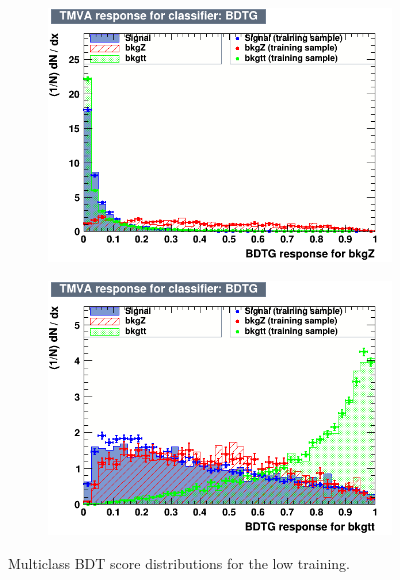 \begin{figure}[!htbp]
  \begin{subfigure}[b]{0.495\textwidth}
    \centering
    \includegraphics[width=\linewidth]{images/plots_overtrain_lt200/overtrain_bkgZ_BDTG.png}
    \label{fig:overtrain_bkgZ}
  \end{subfigure}%
  \hfill
  \begin{subfigure}[b]{0.495\textwidth}
    \centering
    \includegraphics[width=\linewidth]{images/plots_overtrain_lt200/overtrain_bkgtt_BDTG.png}
    \label{fig:overtrain_bkgtt}
  \end{subfigure}
  
  \caption{Multiclass BDT score distributions for the low \pth training.}
  \label{lowpt_scores}
\end{figure}


